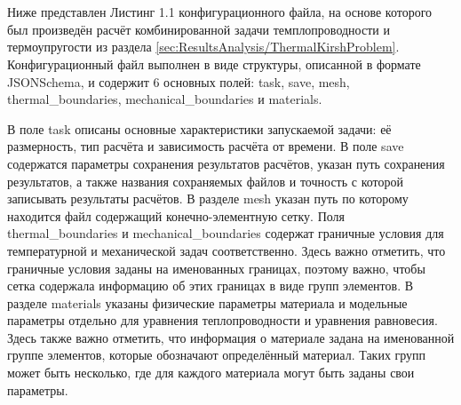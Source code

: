 \chapter{}\label{app:A}

Ниже представлен Листинг 1.1 конфигурационного файла, на основе которого был произведён расчёт комбинированной задачи темплопроводности и термоупругости из раздела \ref{sec:ResultsAnalysis/ThermalKirshProblem}. Конфигурационный файл выполнен в виде структуры, описанной в формате JSONSchema, и содержит 6 основных полей: task, save, mesh, thermal\_boundaries, mechanical\_boundaries и materials.

В поле task описаны основные характеристики запускаемой задачи: её размерность, тип расчёта и зависимость расчёта от времени. В поле save содержатся параметры сохранения результатов расчётов, указан путь сохранения результатов, а также названия сохраняемых файлов и точность с которой записывать результаты расчётов. В разделе mesh указан путь по которому находится файл содержащий конечно-элементную сетку. Поля thermal\_boundaries и mechanical\_boundaries содержат граничные условия для температурной и механической задач соответственно. Здесь важно отметить, что граничные условия заданы на именованных границах, поэтому важно, чтобы сетка содержала информацию об этих границах в виде групп элементов. В разделе materials указаны физические параметры материала и модельные параметры отдельно для уравнения теплопроводности и уравнения равновесия. Здесь также важно отметить, что информация о материале задана на именованной группе элементов, которые обозначают определённый материал. Таких групп может быть несколько, где для каждого материала могут быть заданы свои параметры.

\begingroup
\captiondelim{ } %

\endgroup
